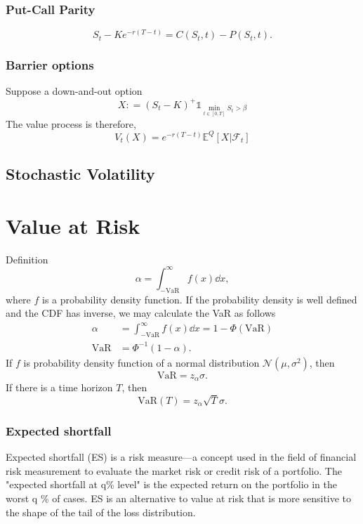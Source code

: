\documentclass[10pt]{article}
\theoremstyle{remark}
\theoremstyle{plain}
\newcommand{\E}{\mathbb{E}}
\numberwithin{equation}{section}
\begin{document}
\subsubsection{Put-Call Parity}
\begin{equation}
	S_t - Ke^{-r(T-t)} = C(S_t, t) - P(S_t,t).
\end{equation}


\subsubsection{Barrier options}
Suppose a down-and-out option
\[
X : = (S_t - K)^+ \mathds{1}_{\min_{t\in[0,T]}S_t > \beta }
\]
The value process is therefore,
\[
 V_t(X) = e^{-r(T-t)} \E^Q [X|\mathcal{F}_t]
\]

\subsection{Stochastic Volatility}

\section{Value at Risk}
Definition
\[
	\alpha = \int^\infty_{-\text{VaR}} f(x) \dd{x},
\]
where $f$ is a probability density function. If the probability density is well defined and the CDF has inverse, we may calculate the VaR as follows
\begin{align*}
	\alpha & = \int^\infty_{-\text{VaR}} f(x) \dd{x} = 1 - \Phi(\text{VaR})
	\\
	\text{VaR} & = \Phi^{-1}(1 - \alpha).
\end{align*}
If $f$ is probability density function of a normal distribution $\mathcal{N}(\mu, \sigma^2)$, then
\[
\text{VaR} =z_\alpha \sigma.
\]
If there is a time horizon $T$, then
\[
\text{VaR}(T) =z_\alpha \sqrt{T} \sigma.
\]

\subsubsection{Expected shortfall}

Expected shortfall (ES) is a risk measure—a concept used in the field of financial risk measurement to evaluate the market risk or credit risk of a portfolio. The "expected shortfall at q\% level" is the expected return on the portfolio in the worst q \% of cases. ES is an alternative to value at risk that is more sensitive to the shape of the tail of the loss distribution.
\end{document}
